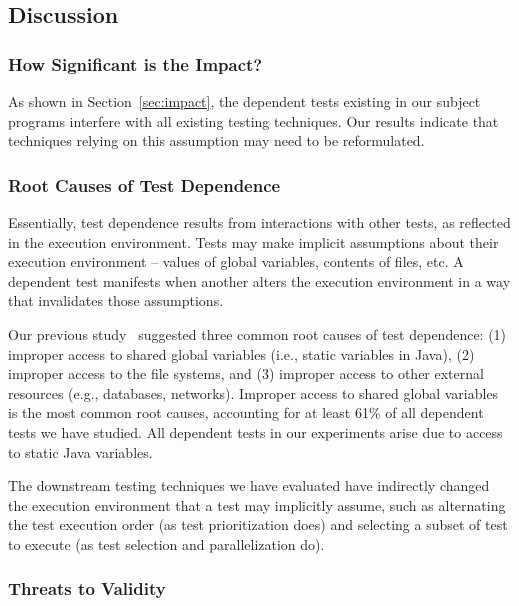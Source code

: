 \subsection{Discussion}

\subsubsection{How Significant is the Impact?}

As shown in Section~\ref{sec:impact},
the dependent tests existing in our subject programs interfere with
all existing  testing techniques. Our results indicate that
techniques relying on this assumption may need to be reformulated.

\subsubsection{Root Causes of Test Dependence}

Essentially, test dependence results from
interactions with other tests, as reflected in
the execution environment. Tests may make
implicit assumptions about their execution environment --
values of global variables, contents of files, etc. A dependent
test manifests when another alters the execution environment
in a way that invalidates those assumptions.

Our previous study~\cite{} suggested three common
root causes of test dependence: (1) improper access
to shared global variables (i.e., static
variables in Java), (2) improper access
to the file systems, and (3) improper access
to other external resources (e.g., databases,
networks). Improper access to
shared global variables is the most common
root causes, accounting for at least 61\% of 
all dependent tests we have studied. All dependent
tests in our experiments arise due to access
to static Java variables.

The downstream testing techniques we have evaluated
have indirectly changed the execution environment
that a test may implicitly assume, such as alternating
the test execution order (as test prioritization
does) and selecting a subset of
test to execute (as test selection and parallelization
do).



\subsubsection{Threats to Validity}

